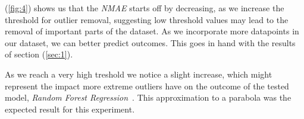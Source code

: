 \documentclass[]{article}
\begin{document}
(\ref{fig:4}) shows us that the \textit{NMAE} starts off by decreasing, as we increase the threshold for outlier removal, suggesting low threshold values may lead to the removal of important parts of the dataset. As we incorporate more datapoints in our dataset, we can better predict outcomes. This goes in hand with the results of section (\ref{sec:1}).

As we reach a very high treshold we notice a slight increase, which might represent the impact more extreme outliers have on the outcome of the tested model, \textit{Random Forest Regression}~\cite{RFR}. This approximation to a parabola was the expected result for this experiment.

\printbibliography
\end{document}
